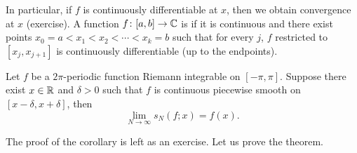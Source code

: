 In particular,
if $f$ is continuously
differentiable at $x$,
then we obtain convergence at $x$ (exercise).
A function $f \colon [a,b] \to {\mathbb{C}}$ is
\emph{}
if it is continuous and there exist points
$x_0 = a < x_1 < x_2 < \cdots < x_k = b$
such that for every $j$, $f$ restricted to $[x_j,x_{j+1}]$
is continuously differentiable (up to the endpoints).

\begin{cor} \label{cor:fourierpiecewisesmooth}
Let $f$ be a $2\pi$-periodic function
Riemann integrable on $[-\pi,\pi]$.  Suppose
there exist $x\in {\mathbb{R}}$ and $\delta > 0$ such that $f$ is continuous piecewise
smooth on $[x-\delta,x+\delta]$, then
\begin{equation*}
\lim_{N \to \infty} s_N(f;x) = f(x) .
\end{equation*}
\end{cor}

The proof of the corollary is left as an exercise.  Let us prove the
theorem.

